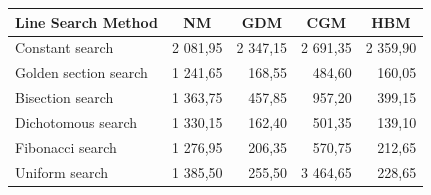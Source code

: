 \documentclass[a4paper,english,titlepage,12pt]{article}
\begin{document}
\begin{table}[H]
    \centering
    \label{tab:colors_avg_overall_mm}
    \begin{tabular}{|l|r|r|r|r|}
    \hline
    \rowcolor[HTML]{C0C0C0} 
    \textbf{Line Search Method} & \multicolumn{1}{c|}{\cellcolor[HTML]{C0C0C0}\textbf{NM}} & \multicolumn{1}{c|}{\cellcolor[HTML]{C0C0C0}\textbf{GDM}} & \multicolumn{1}{c|}{\cellcolor[HTML]{C0C0C0}\textbf{CGM}} & \multicolumn{1}{c|}{\cellcolor[HTML]{C0C0C0}\textbf{HBM}} \\ \hline
    Constant search              & \cellcolor[HTML]{E67B73}2 081,95                         & \cellcolor[HTML]{E67B73}2 347,15                          & \cellcolor[HTML]{EDA19C}2 691,35                          & \cellcolor[HTML]{E67B73}2 359,90                          \\ \hline
    Golden section search         & \cellcolor[HTML]{57BB89}1 241,65                         & \cellcolor[HTML]{91D2B2}168,55                            & \cellcolor[HTML]{91D2B2}484,60                            & \cellcolor[HTML]{91D2B2}160,05                            \\ \hline
    Bisection search             & 1 363,75                                                 & 457,85                                                    & 957,20                                                    & 399,15                                                    \\ \hline
    Dichotomous search           & \cellcolor[HTML]{D2ECDF}1 330,15                         & \cellcolor[HTML]{91D2B2}162,40                            & \cellcolor[HTML]{91D2B2}501,35                            & \cellcolor[HTML]{57BB89}139,10                            \\ \hline
    Fibonacci search             & \cellcolor[HTML]{91D2B2}1 276,95                         & \cellcolor[HTML]{D2ECDF}206,35                            & \cellcolor[HTML]{91D2B2}570,75                            & 212,65                                                    \\ \hline
    Uniform search               & 1 385,50                                                 & 255,50                                                    & \cellcolor[HTML]{E67B73}3 464,65                          & 228,65                                                    \\ \hline

\end{tabular}
\end{table}
\end{document}
